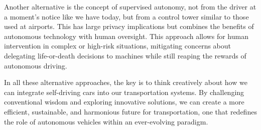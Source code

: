 Another alternative is the concept of supervised autonomy, not from the driver at a moment's notice like we have today, but from a control tower similar to those used at airports. This has large privacy implications but combines the benefits of autonomous technology with human oversight. This approach allows for human intervention in complex or high-risk situations, mitigating concerns about delegating life-or-death decisions to machines while still reaping the rewards of autonomous driving.

In all these alternative approaches, the key is to think creatively about how we can integrate self-driving cars into our transportation systems. By challenging conventional wisdom and exploring innovative solutions, we can create a more efficient, sustainable, and harmonious future for transportation, one that redefines the role of autonomous vehicles within an ever-evolving paradigm.
